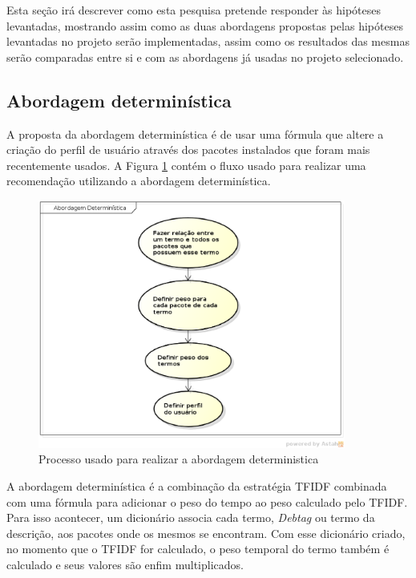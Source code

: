 Esta seção irá descrever como esta pesquisa pretende responder às hipóteses
levantadas, mostrando assim como as duas abordagens propostas pelas hipóteses
levantadas no projeto serão implementadas, assim como os resultados das mesmas
serão comparadas entre si e com as abordagens já usadas no projeto selecionado.

\subsection{Abordagem determinística}

A proposta da abordagem determinística é de usar uma fórmula que altere
a criação do perfil de usuário através dos pacotes instalados que foram mais
recentemente usados. A Figura \ref{fig:abordagem_deterministica}
contém o fluxo usado para realizar uma
recomendação utilizando a abordagem determinística.

\begin{figure}[h]
  \centering
  \includegraphics[width=0.9\textwidth]{figuras/abordagem_deterministica.eps}
  \caption{Processo usado para realizar a abordagem deterministica}
  \label{fig:abordagem_deterministica}
\end{figure}

A abordagem determinística é a combinação da estratégia TFIDF combinada com
uma fórmula para adicionar o peso do tempo ao peso calculado pelo TFIDF. Para
isso acontecer, um dicionário associa cada termo, \textit{Debtag} ou termo da
descrição, aos pacotes onde os mesmos se encontram. Com esse dicionário criado,
no momento que o TFIDF for calculado, o peso temporal do termo também é
calculado e seus valores são enfim multiplicados.

